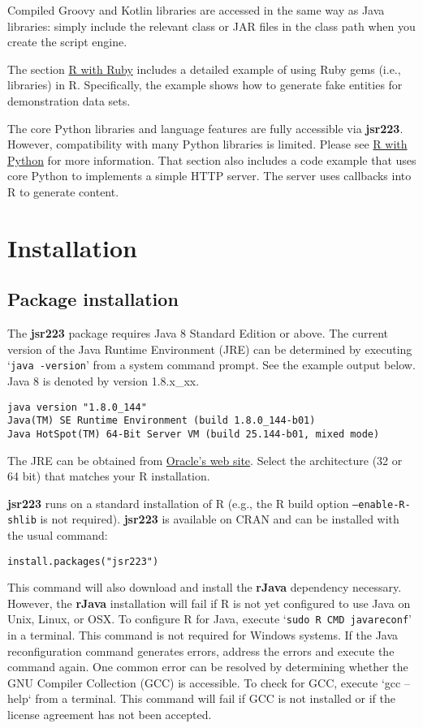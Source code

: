 \documentclass[
article,
11pt, %
a4paper, %
oneside, %
headinclude,footinclude, %
]{scrartcl}
\theoremstyle{definition} %
\theoremstyle{plain} %
\theoremstyle{remark} %
\newcommand{\pkg}[1]{\textbf{#1}}
\newcommand{\code}[1]{\texttt{#1}}
\newcommand{\samp}[1]{{`\normalfont\texttt{#1}'}}
\begin{document}
Compiled Groovy and Kotlin libraries are accessed in the same way as Java libraries: simply include the relevant class or JAR files in the class path when you create the script engine.

The section \hyperlink{r-with-ruby}{R with Ruby} includes a detailed example of using Ruby gems (i.e., libraries) in R. Specifically, the example shows how to generate fake entities for demonstration data sets.

The core Python libraries and language features are fully accessible via \pkg{jsr223}. However, compatibility with many Python libraries is limited. Please see \hyperlink{r-with-python}{R with Python} for more information. That section also includes a code example that uses core Python to implements a simple HTTP server. The server uses callbacks into R to generate content.

\hypertarget{installation}{}
\section{Installation}

\hypertarget{package-installation}{}
\subsection{Package installation}

The \pkg{jsr223} package requires Java 8 Standard Edition or above. The current version of the Java Runtime Environment (JRE) can be determined by executing \samp{java -version} from a system command prompt. See the example output below. Java 8 is denoted by version 1.8.x\_xx.

\begin{verbatim}
java version "1.8.0_144"
Java(TM) SE Runtime Environment (build 1.8.0_144-b01)
Java HotSpot(TM) 64-Bit Server VM (build 25.144-b01, mixed mode)
\end{verbatim}

The JRE can be obtained from  \href{http://www.oracle.com/technetwork/java/javase/downloads/jre8-downloads-2133155.html}{Oracle's web site}. Select the architecture (32 or 64 bit) that matches your R installation.

\pkg{jsr223} runs on a standard installation of R (e.g., the R build option \code{--enable-R-shlib} is not required). \pkg{jsr223} is available on CRAN and can be installed with the usual command:

\begin{verbatim}
install.packages("jsr223")
\end{verbatim}
This command will also download and install the \pkg{rJava} dependency necessary. However, the \pkg{rJava} installation will fail if R is not yet configured to use Java on Unix, Linux, or OSX. To configure R for Java, execute \samp{sudo R CMD javareconf} in a terminal. This command is not required for Windows systems. If the Java reconfiguration command generates errors, address the errors and execute the command again. One common error can be resolved by determining whether the GNU Compiler Collection (GCC) is accessible. To check for GCC, execute `gcc --help` from a terminal. This command will fail if GCC is not installed or if the license agreement has not been accepted.
\end{document}
